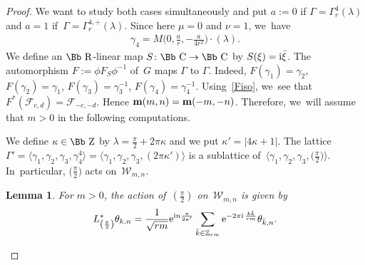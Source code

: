 \documentclass[pdftex]{sigma}
\newcommand\CC{{\mbox{\Bb C}}}
\newcommand\RR{{\mbox{\Bb R}}}
\newcommand\ZZ{{\mbox{\Bb Z}}}
\newcommand\Z{{\mathbb Z}}
\newcommand\bm{\textbf{{\rm \textbf{m}}}}
\newcommand\cF{{\mathcal F}}
\newcommand\la{\langle}
\newcommand\ra{\rangle}
\numberwithin{equation}{section}
\newtheorem{Lemma}[Theorem]{Lemma}
\begin{document}
\begin{proof}
We want to study both cases simultaneously and put $a:=0$ if $\Gamma=\Gamma_r^4(\lambda)$ and $a=1$ if~$\Gamma=\Gamma_r^{4,+}(\lambda)$. Since here $\mu=0$ and $\nu=1$, we~have
\begin{gather*}
\gamma_4= M\bigg(0, \frac ar,-\frac{a}{4r^2}\bigg)\cdot(\lambda).
\end{gather*}
We define an $\RR$-linear map $S\colon \CC\to\CC$ by $S(\xi)={\rm i}\bar\xi$. The automorphism $F:=\phi F_{S}\phi^{-1}$ of~$G$ maps $\Gamma$ to $\Gamma$. Indeed, $F(\gamma_1)=\gamma_2$, $F(\gamma_2)=\gamma_1$, $F(\gamma_3)=\gamma_3^{-1}$, $F(\gamma_4)=\gamma_4^{-1}$. Using~\eqref{Fiso}, we~see that $F^*(\cF_{c,d})=\cF_{-c,-d}$. Hence $\bm(m,n)=\bm(-m,-n)$. Therefore, we~will assume that $m>0$ in the following computations.

We define $\kappa\in\ZZ$ by $\lambda=\frac\pi2+2\pi\kappa$ and we put $\kappa'=|4\kappa+1|$.
The lattice $\Gamma'=\la \gamma_1,\gamma_2,\gamma_3,\gamma_4^4\ra=\la \gamma_1,\gamma_2,\gamma_3,(2\pi \kappa')\ra$ is a sublattice of~$\la \gamma_1,\gamma_2,\gamma_3,\big(\frac\pi2\big)\ra$. In~particular, $\big(\frac\pi2\big)$ acts on~${\mathcal W}_{m,n}$.
%
\begin{Lemma}
For $m>0$, the action of~$(\frac{\pi}{2})$ on~${\mathcal W}_{m,n}$ is given by
\begin{gather*}
L^*_{\left(\frac{\pi}{2}\right)}\theta_{k,n}= \frac{1}{\sqrt{rm}}{\rm e}^{{\rm i}n \frac{\pi}{2\kappa'}}\sum_{\bar k\in\Z_{rm}}{\rm e}^{-2\pi {\rm i}\, \frac{k\bar k}{rm}}\theta_{\bar k,n}.
\end{gather*}
\end{Lemma}


\end{proof}
\end{document}
